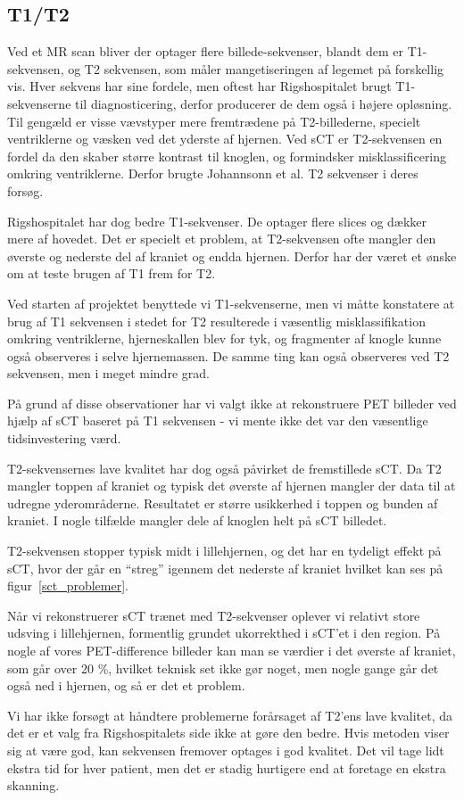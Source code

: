 \subsection{T1/T2}

Ved et MR scan bliver der optager flere billede-sekvenser, blandt dem er T1-sekvensen, og T2 sekvensen, som måler mangetiseringen af legemet på forskellig vis. Hver sekvens har sine fordele, men oftest har Rigshospitalet brugt T1-sekvenserne til diagnosticering, derfor producerer de dem også i højere opløsning. Til gengæld er visse vævstyper mere fremtrædene på T2-billederne, specielt ventriklerne og væsken ved det yderste af hjernen. Ved sCT er T2-sekvensen en fordel da den skaber større kontrast til knoglen, og formindsker misklassificering omkring ventriklerne. Derfor brugte Johannsonn et al. T2 sekvenser i deres forsøg.

Rigshospitalet har dog bedre T1-sekvenser. De optager flere slices og dækker mere af hovedet. Det er specielt et problem, at T2-sekvensen ofte mangler den øverste og nederste del af kraniet og endda hjernen. Derfor har der været et ønske om at teste brugen af T1 frem for T2.

Ved starten af projektet benyttede vi T1-sekvenserne, men vi måtte konstatere at brug af T1 sekvensen i stedet for T2 resulterede i væsentlig misklassifikation omkring ventriklerne, hjerneskallen blev for tyk, og fragmenter af knogle kunne også observeres i selve hjernemassen. De samme ting kan også observeres ved T2 sekvensen, men i meget mindre grad.

På grund af disse observationer har vi valgt ikke at rekonstruere PET billeder ved hjælp af sCT baseret på T1 sekvensen - vi mente ikke det var den væsentlige tidsinvestering værd.

T2-sekvensernes lave kvalitet har dog også påvirket de fremstillede sCT. Da T2 mangler toppen af kraniet og typisk det øverste af hjernen mangler der data til at udregne yderområderne. Resultatet er større usikkerhed i toppen og bunden af kraniet. I nogle tilfælde mangler dele af knoglen helt på sCT billedet. 

T2-sekvensen stopper typisk midt i lillehjernen, og det har en tydeligt effekt på sCT, hvor der går en “streg” igennem det nederste af kraniet hvilket kan ses på figur~\ref{sct_problemer}. 

Når vi rekonstruerer sCT trænet med T2-sekvenser oplever vi relativt store udsving i lillehjernen, formentlig grundet ukorrekthed i sCT’et i den region. På nogle af vores PET-difference billeder kan man se værdier i det øverste af kraniet, som går over 20 \%, hvilket teknisk set ikke gør noget, men nogle gange går det også ned i hjernen, og så er det et problem.

Vi har ikke forsøgt at håndtere problemerne forårsaget af T2’ens lave kvalitet, da det er et valg fra Rigshospitalets side ikke at gøre den bedre. Hvis metoden viser sig at være god, kan sekvensen fremover optages i god kvalitet. Det vil tage lidt ekstra tid for hver patient, men det er stadig hurtigere end at foretage en ekstra skanning.
